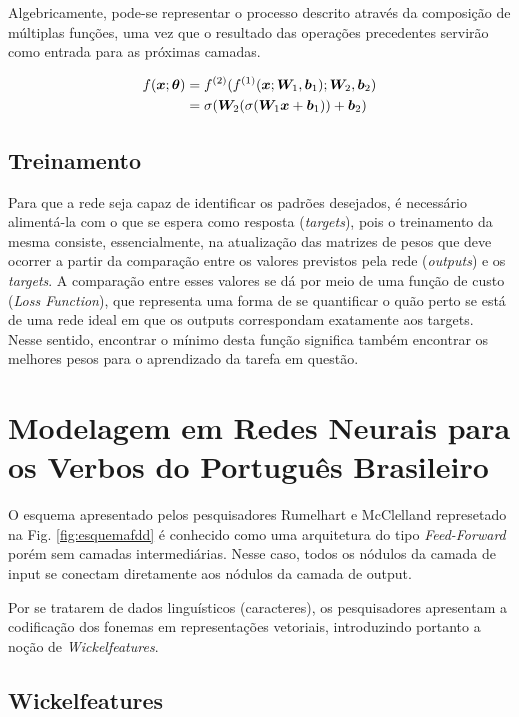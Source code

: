 Algebricamente, pode-se representar o processo descrito através da composição de múltiplas funções, uma vez que o resultado das operações precedentes servirão como entrada para as próximas camadas.

\begin{align}
f(\bm{x}; \bm{\theta}) &= f^{(2)}(f^{(1)}(\bm{x}; \bm{W}_1, \bm{b}_1); \bm{W}_2, \bm{b}_2)\\
&= \sigma(\bm{W}_2 (\sigma(\bm{W}_1\bm{x} + \bm{b}_1)) + \bm{b}_2)
\end{align}

\subsection{Treinamento}

Para que a rede seja capaz de identificar os padrões desejados, é necessário alimentá-la com o que se espera como resposta (\textit{targets}), pois o treinamento da mesma consiste, essencialmente, na atualização das matrizes de pesos que deve ocorrer a partir da comparação entre os valores previstos pela rede (\textit{outputs}) e os \textit{targets}. A comparação entre esses valores se dá por meio de uma função de custo (\textit{Loss Function}), que representa uma forma de se quantificar o quão perto se está de uma rede ideal em que os outputs correspondam exatamente aos targets. Nesse sentido, encontrar o mínimo desta função significa também encontrar os melhores pesos para o aprendizado da tarefa em questão.

\section{Modelagem em Redes Neurais para os Verbos do Português Brasileiro}

O esquema apresentado pelos pesquisadores Rumelhart e McClelland represetado na Fig. \ref{fig:esquemafdd} é conhecido como uma arquitetura do tipo \textit{Feed-Forward} porém sem camadas intermediárias. Nesse caso, todos os nódulos da camada de input se conectam diretamente aos nódulos da camada de output.

Por se tratarem de dados linguísticos (caracteres), os pesquisadores apresentam a codificação dos fonemas em representações vetoriais, introduzindo portanto a noção de \textit{Wickelfeatures}.

\subsection{Wickelfeatures}

